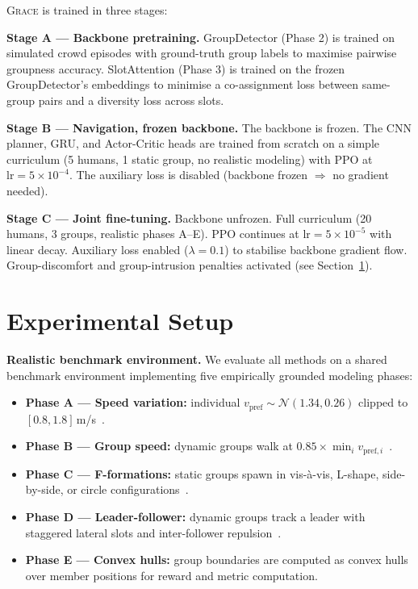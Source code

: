 \documentclass{article}
\newcommand{\grace}{\textsc{Grace}}
\begin{document}
\grace{} is trained in three stages:

\textbf{Stage A — Backbone pretraining.}
GroupDetector (Phase 2) is trained on simulated crowd episodes with ground-truth
group labels to maximise pairwise groupness accuracy. SlotAttention (Phase 3)
is trained on the frozen GroupDetector's embeddings to minimise a
co-assignment loss between same-group pairs and a diversity loss across slots.

\textbf{Stage B — Navigation, frozen backbone.}
The backbone is frozen. The CNN planner, GRU, and Actor-Critic heads are trained
from scratch on a simple curriculum (5 humans, 1 static group, no realistic
modeling) with PPO at $\text{lr}=5\times 10^{-4}$.
The auxiliary loss is disabled (backbone frozen $\Rightarrow$ no gradient needed).

\textbf{Stage C — Joint fine-tuning.}
Backbone unfrozen. Full curriculum (20 humans, 3 groups, realistic phases A–E).
PPO continues at $\text{lr}=5\times 10^{-5}$ with linear decay.
Auxiliary loss enabled ($\lambda=0.1$) to stabilise backbone gradient flow.
Group-discomfort and group-intrusion penalties activated (see Section~\ref{sec:setup}).

\section{Experimental Setup}
\label{sec:setup}

\textbf{Realistic benchmark environment.}
We evaluate all methods on a shared benchmark environment implementing five
empirically grounded modeling phases:
\begin{itemize}\setlength\itemsep{0pt}
  \item \textbf{Phase A — Speed variation:} individual $v_\text{pref} \sim \mathcal{N}(1.34, 0.26)$ clipped to $[0.8, 1.8]$\,m/s~\citep{weidmann1992social}.
  \item \textbf{Phase B — Group speed:} dynamic groups walk at $0.85 \times \min_i v_{\text{pref},i}$~\citep{moussaid2010walking}.
  \item \textbf{Phase C — F-formations:} static groups spawn in vis-à-vis, L-shape, side-by-side, or circle configurations~\citep{kendon1990conducting}.
  \item \textbf{Phase D — Leader-follower:} dynamic groups track a leader with staggered lateral slots and inter-follower repulsion~\citep{helbing1995social}.
  \item \textbf{Phase E — Convex hulls:} group boundaries are computed as convex hulls over member positions for reward and metric computation.
\end{itemize}
\end{document}
